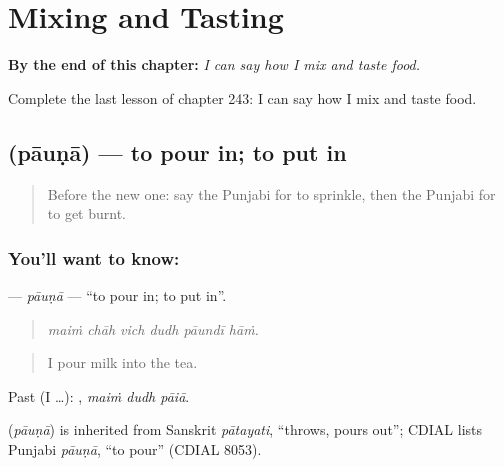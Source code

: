 
\chapter{Mixing and Tasting}
\label{ch:pa-a2-mixing-and-tasting}

\begin{chapteropening}
\textbf{By the end of this chapter:} \emph{I can say how I mix and taste food.}

Complete the last lesson of chapter 243: I can say how I mix and taste food.
\end{chapteropening}

\section[\texorpdfstring{\pa{ਪਾਉਣਾ} (pāuṇā)}{ਪਾਉਣਾ (pāuṇā)}]{ (pāuṇā) — to pour in; to put in}

\label{lesson:PA-C243-pauna}



\begin{quote}
Before the new one: say the Punjabi for to sprinkle, then the Punjabi for to get burnt.
\end{quote}

\subsection*{You'll want to know: }
\textbf{} — \emph{pāuṇā} — \textquotedblleft{}to pour in; to put in\textquotedblright{}.

\begin{quote}
     
\end{quote}

\begin{quote}
\emph{maiṁ chāh vich dudh pāundī hāṁ.}
\end{quote}

\begin{quote}
I pour milk into the tea.
\end{quote}

Past (I …):   , \emph{maiṁ dudh pāiā}.

\begin{cousinweb}
\textbf{} (\emph{pāuṇā}) is inherited from Sanskrit \emph{pātayati}, \textquotedblleft{}throws, pours out\textquotedblright{}; CDIAL lists Punjabi \emph{pāuṇā}, \textquotedblleft{}to pour\textquotedblright{} (CDIAL 8053).
\end{cousinweb}

